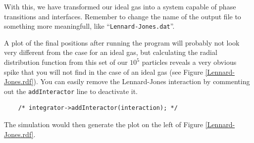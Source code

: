 With this, we have transformed our ideal gas into a system capable of phase
transitions and interfaces. Remember to change the name of the output file to
something more meaningfull, like ``\texttt{Lennard-Jones.dat}''.

A plot of the final positions after running the program will probably not look
very different from the case for an ideal gas, but calculating the radial
distribution function from this set of our $10^5$ particles reveals a very
obvious spike that you will not find in the case of an ideal gas (see Figure
\ref{Lennard-Jones.rdf}). You can easily remove the Lennard-Jones interaction by
commenting out the \texttt{addInteractor} line to deactivate it.
\begin{lstlisting}
    /* integrator->addInteractor(interaction); */
\end{lstlisting}
The simulation would then generate the plot on the left of Figure
\ref{Lennard-Jones.rdf}.

